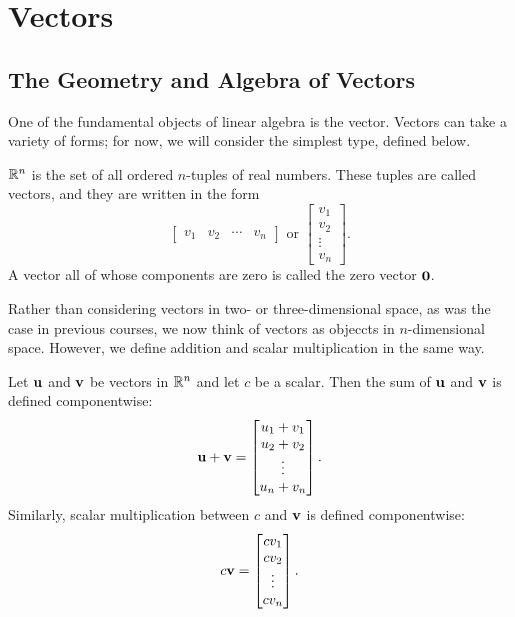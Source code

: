 \documentclass[../m73main.tex]{subfiles}
\begin{document}
\chapter{Vectors}

\section{The Geometry and Algebra of Vectors}
One of the fundamental objects of linear algebra is the vector.
Vectors can take a variety of forms; for now, we will consider the simplest type, defined below.

\begin{definition}[Vectors in $\R^n$]
	$\R^n$ is the set of all ordered $n$-tuples of real numbers.
	These tuples are called vectors, and they are written in the form
	\[ \begin{bmatrix} v_1 & v_2 & \cdots & v_n \end{bmatrix} \text{ or } \begin{bmatrix} v_1 \\ v_2 \\ \vdots \\ v_n \end{bmatrix}. \]
	A vector all of whose components are zero is called the zero vector $\mathbf{0}$.
\end{definition}

Rather than considering vectors in two- or three-dimensional space, as was the case in previous courses, we now think of vectors as objeccts in $n$-dimensional space.
However, we define addition and scalar multiplication in the same way.

\begin{definition}
	Let $\mathbf{u}$ and $\mathbf{v}$ be vectors in $\R^n$ and let $c$ be a scalar.
	Then the sum of $\mathbf{u}$ and $\mathbf{v}$ is defined componentwise:
	\[ \mathbf{u} + \mathbf{v} = \begin{bmatrix} u_1 + v_1 \\ u_2 + v_2 \\ \vdots \\ u_n + v_n \end{bmatrix}. \]
	Similarly, scalar multiplication between $c$ and $\mathbf{v}$ is defined componentwise:
	\[ c \mathbf{v} = \begin{bmatrix} cv_1 \\ cv_2 \\ \vdots \\ cv_n \end{bmatrix}. \]
\end{definition}
\end{document}
